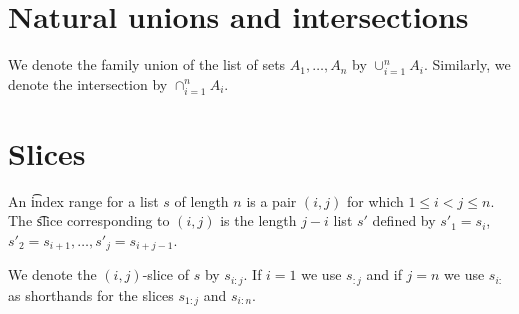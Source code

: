 \section*{Natural unions and intersections}

We denote the family union of the list of sets $A_1, \dots , A_n$ by $\cup_{i = 1}^{n} A_i$.
Similarly, we denote the intersection by $\cap _{i = 1}^{n} A_i$.
\section*{Slices}

An \t{index range} for a list $s$ of length $n$ is a pair $(i, j)$ for which $1 \leq i < j \leq n$.
The \t{slice} corresponding to $(i,j)$ is the length $j-i$ list $s'$ defined by $s'_1 = s_{i}$, $s'_2 = s_{i+1}, \dots, s'_{j} = s_{i + j-1}$.

We denote the $(i,j)$-slice of $s$ by $s_{i:j}$.
If $i = 1$ we use $s_{:j}$ and if $j = n$ we use $s_{i:}$ as shorthands for the slices $s_{1:j}$ and $s_{i:n}$.
